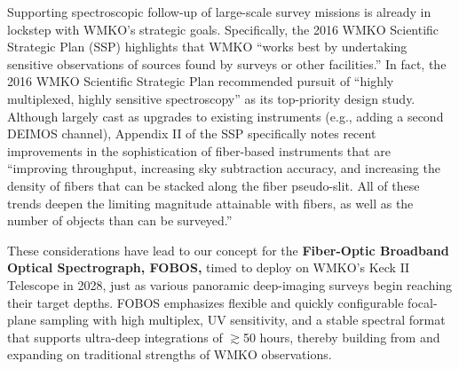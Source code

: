\documentclass[11pt,a4paper,twoside,onecolumn,openany,final,oldfontcommands]{memoir}
\begin{document}
Supporting spectroscopic follow-up of large-scale survey missions is already in lockstep with WMKO's strategic goals.  Specifically, the 2016 WMKO Scientific Strategic Plan (SSP) highlights that WMKO ``works best by undertaking sensitive observations of sources found by surveys or other facilities.''  In fact, the 2016 WMKO Scientific Strategic Plan recommended pursuit of ``highly multiplexed, highly sensitive spectroscopy'' as its top-priority design study.  Although largely cast as upgrades to existing instruments (e.g., adding a second DEIMOS channel), Appendix II of the SSP specifically notes recent improvements in the sophistication of fiber-based instruments that are ``improving throughput, increasing sky subtraction accuracy, and increasing the density of fibers that can be stacked along the fiber pseudo-slit. All of these trends deepen the limiting magnitude attainable with fibers, as well as the number of objects than can be surveyed.''

These considerations have lead to our concept for the {\bf Fiber-Optic Broadband Optical Spectrograph, FOBOS,} timed to deploy on WMKO's Keck II Telescope in 2028, just as various panoramic deep-imaging surveys begin reaching their target depths.  FOBOS emphasizes flexible and quickly configurable focal-plane sampling with high multiplex, UV sensitivity, and a stable spectral format that supports ultra-deep integrations of $\gtrsim$50 hours, thereby building from and expanding on traditional strengths of WMKO observations.



\end{document}
